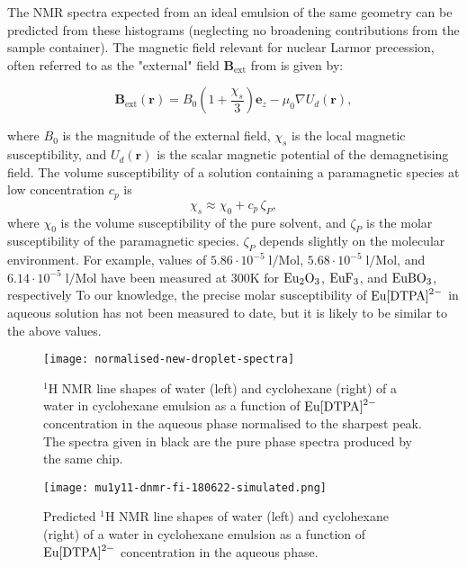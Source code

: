 The NMR spectra expected from an ideal emulsion of the same geometry can
be predicted from these histograms
(neglecting no broadening contributions from the sample container).
The magnetic field relevant for nuclear Larmor precession, often referred
to as the "external" field \citep{Levitt:1996tg} $\mathbf{B}_\text{ext}$  from
 is given by:

\begin{equation}
\mathbf{B}_\text{ext}(\mathbf{r})
= B_0 (1+\frac{\chi_s}{3}) \mathbf{e}_z  - {\mu_0} \nabla U_d(\mathbf{r}),
\end{equation}

where $B_0$ is the magnitude of the external field, $\chi_s$ is the local
magnetic susceptibility, and $U_d(\mathbf{r})$ is the scalar magnetic potential
of the demagnetising field. The volume susceptibility of a solution containing a
paramagnetic species at low concentration $c_p$ is
\begin{equation}
    \chi_s \approx \chi_0 + c_p\,\zeta_P,
\end{equation}
where $\chi_0$ is the volume susceptibility of the pure solvent,
and $\zeta_P$ is the
molar susceptibility of the paramagnetic species. $\zeta_P$ depends
slightly on the molecular environment. For example, values of
$5.86\cdot 10^{-5}\;\mathrm{l/\text{Mol}}$,
$5.68\cdot 10^{-5}\;\mathrm{l/\text{Mol}}$, and
$6.14\cdot 10^{-5}\;\mathrm{l/\text{Mol}}$ have been measured at 300K for
$\ce{Eu_2O_3}$, $\ce{EuF_3}$, and $\ce{EuBO_3}$, respectively\citep{Takikawa:2010iw}
To our knowledge, the precise molar susceptibility of $\ce{Eu[DTPA]^{2-}}$ in
aqueous solution has not been measured to date, but it is likely to be
similar to the above values.

\begin{figure}
  \begin{center}
    \texttt{[image: normalised-new-droplet-spectra]}
  \end{center}
  \caption{$^1$H NMR line shapes of water (left) and cyclohexane (right) of a
  water in cyclohexane emulsion as a function of $\ce{Eu[DTPA]^{2-}}$ concentration
  in the aqueous phase normalised to the sharpest peak. The spectra given in black are the pure phase spectra produced by the same chip.
  }
  \label{fig:droplet-spectra}
\end{figure}


\begin{figure}
  \begin{center}
    \texttt{[image: mu1y11-dnmr-fi-180622-simulated.png]}
  \end{center}
  \caption{Predicted $^1$H NMR line shapes of water (left) and cyclohexane (right) of a
  water in cyclohexane emulsion as a function of $\ce{Eu[DTPA]^{2-}}$ concentration
  in the aqueous phase.
  }
  \label{fig:predicted-spectra}
\end{figure}

